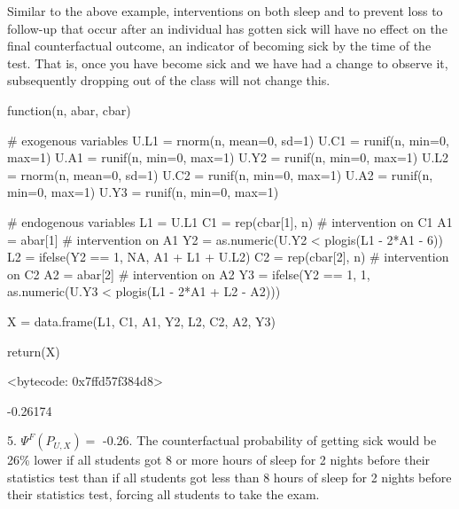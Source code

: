 \documentclass[answers]{exam}
\begin{document}
\begin{solution}
Similar to the above example, interventions on both sleep and to prevent loss to follow-up that occur after an individual has gotten sick will have no effect on the final counterfactual outcome, an indicator of becoming sick by the time of the test. That is, once you have become sick and we have had a change to observe it, subsequently dropping out of the class will not change this.




\begin{Schunk}
\begin{Soutput}
function(n, abar, cbar) {
  
  # exogenous variables
  U.L1 = rnorm(n, mean=0, sd=1)
  U.C1 = runif(n, min=0, max=1)
  U.A1 = runif(n, min=0, max=1)
  U.Y2 = runif(n, min=0, max=1)
  U.L2 = rnorm(n, mean=0, sd=1)
  U.C2 = runif(n, min=0, max=1)
  U.A2 = runif(n, min=0, max=1)
  U.Y3 = runif(n, min=0, max=1)
  
  # endogenous variables
  L1 = U.L1
  C1 = rep(cbar[1], n) # intervention on C1
  A1 = abar[1] # intervention on A1
  Y2 = as.numeric(U.Y2 < plogis(L1 - 2*A1 - 6))
  L2 = ifelse(Y2 == 1, NA, A1 + L1 + U.L2)
  C2 = rep(cbar[2], n) # intervention on C2
  A2 = abar[2] # intervention on A2
  Y3 = ifelse(Y2 == 1, 1, as.numeric(U.Y3 < plogis(L1 - 2*A1 + L2 - A2)))
  
  X = data.frame(L1, C1, A1, Y2, L2, C2, A2, Y3)
  
  return(X)
  
}
<bytecode: 0x7ffd57f384d8>
\end{Soutput}
\end{Schunk}

\begin{Schunk}
\begin{Soutput}
[1] -0.26174
\end{Soutput}
\end{Schunk}


5. $\Psi^F(P_{U,X}) = $ -0.26. The counterfactual probability of getting sick would be 26\% lower if all students got 8 or more hours of sleep for 2 nights before their statistics test than if all students got less than 8 hours of sleep for 2 nights before their statistics test, forcing all students to take the exam.


\end{solution}
\end{document}
